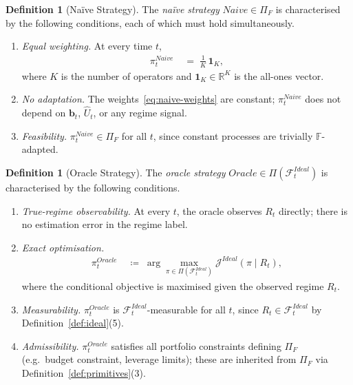 \documentclass[12pt,openany]{book}
\numberwithin{equation}{chapter}
\theoremstyle{plain}
\theoremstyle{definition}
\newtheorem{definition}[theorem]{Definition}
\theoremstyle{remark}
\numberwithin{equation}{chapter}
\theoremstyle{plain}
\newcommand{\Ideal}{\mathcal{E}_{I}}
\newcommand{\Naive}{N}
\newcommand{\Oracle}{O}
\def\Naive{Naive}%
\def\Oracle{Oracle}%
\def\Ideal{Ideal}%
\begin{document}
\begin{definition}[Na\"{i}ve Strategy]
\label{def:naive}
The \emph{na\"{i}ve strategy} $\Naive \in \Pi_F$ is characterised
by the following conditions, each of which must hold simultaneously.
\begin{enumerate}
  \item \emph{Equal weighting.}  At every time $t$,
        \begin{align}
          \pi_t^{\Naive}
          &\;=\;
          \frac{1}{K}\,\mathbf{1}_K,
          \label{eq:naive-weights}
        \end{align}
        where $K$ is the number of operators and
        $\mathbf{1}_K \in \mathbb{R}^K$ is the all-ones vector.
  \item \emph{No adaptation.}  The weights~\eqref{eq:naive-weights}
        are constant; $\pi_t^{\Naive}$ does not depend on
        $\mathbf{b}_t$, $\hat{U}_t$, or any regime signal.
  \item \emph{Feasibility.}  $\pi_t^{\Naive} \in \Pi_F$ for all $t$,
        since constant processes are trivially $\mathbb{F}$-adapted.
\end{enumerate}
\end{definition}

\begin{definition}[Oracle Strategy]
\label{def:oracle}
The \emph{oracle strategy} $\Oracle \in \Pi(\mathcal{F}_t^{\Ideal})$
is characterised by the following conditions.
\begin{enumerate}
  \item \emph{True-regime observability.}
        At every $t$, the oracle observes $R_t$ directly;
        there is no estimation error in the regime label.
  \item \emph{Exact optimisation.}
        \begin{align}
          \pi_t^{\Oracle}
          &\;\coloneqq\;
          \arg\max_{\pi \in \Pi(\mathcal{F}_t^{\Ideal})}
          \mathcal{J}^{\Ideal}(\pi \mid R_t),
          \label{eq:oracle-opt}
        \end{align}
        where the conditional objective is maximised given the
        observed regime $R_t$.
  \item \emph{Measurability.}
        $\pi_t^{\Oracle}$ is
        $\mathcal{F}_t^{\Ideal}$-measurable for all $t$,
        since $R_t \in \mathcal{F}_t^{\Ideal}$ by
        Definition~\ref{def:ideal}(5).
  \item \emph{Admissibility.}
        $\pi_t^{\Oracle}$ satisfies all portfolio constraints
        defining $\Pi_F$ (e.g.\ budget constraint, leverage
        limits); these are inherited from $\Pi_F$ via
        Definition~\ref{def:primitives}(3).
\end{enumerate}
\end{definition}
\end{document}
